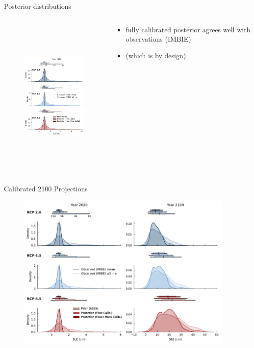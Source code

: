 \documentclass[hide notes,intlimits]{beamer}
\begin{document}
\begin{frame}{Posterior distributions}
  \begin{columns}[c]
    \begin{column}{.5\textwidth}
      \begin{figure}
        \includegraphics[height=7.75cm]{sle_pdf_w_obs_calibrated_2020.pdf}
      \end{figure}
    \end{column}
    \begin{column}{.5\textwidth}
      \begin{itemize}
      \item fully calibrated posterior agrees well with observations (IMBIE)
      \item (which is by design)
      \end{itemize}
    \end{column}
  \end{columns}
\end{frame}



\begin{frame}{Calibrated 2100 Projections}
    \begin{figure}
      \includegraphics[height=7.75cm]{sle_pdf_w_obs_2020_2100}
    \end{figure}
\end{frame}
\end{document}
